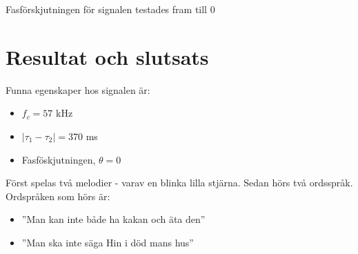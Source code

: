 \documentclass[10pt,twocolumn]{article}
\begin{document}
Fasförskjutningen för signalen testades fram till $0$


\section{Resultat och slutsats}

Funna egenskaper hos signalen är: 

\begin{itemize}
	\item $f_c = 57$ kHz
	\item $|\tau_1 - \tau_2| = 370$ ms
  \item Fasföskjutningen, $\theta = 0$
\end{itemize}

Först spelas två melodier - varav en blinka lilla stjärna. Sedan hörs två ordsspråk. Ordspråken som hörs är: 

\begin{itemize}
	\item ''Man kan inte både ha kakan och äta den''
	\item ''Man ska inte säga Hin i död mans hus''
\end{itemize}


\end{document}
